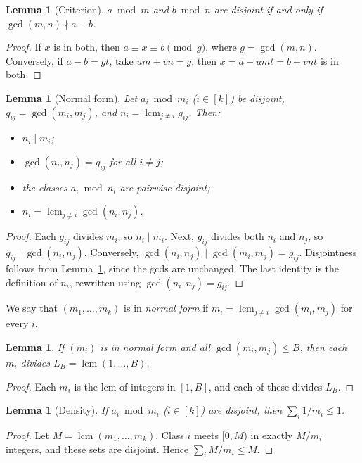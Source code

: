 \documentclass[11pt]{article}
\newtheorem{lemma}[theorem]{Lemma}
\theoremstyle{definition}
\theoremstyle{remark}
\begin{document}
\begin{lemma}[Criterion]\label{lem:crt}
$a\bmod m$ and $b\bmod n$ are disjoint if and only if $\gcd(m,n)\nmid a-b$.
\end{lemma}
\begin{proof}
If $x$ is in both, then $a\equiv x\equiv b\pmod{g}$, where $g=\gcd(m,n)$. Conversely, if $a-b=gt$,
take $um+vn=g$; then $x=a-umt=b+vnt$ is in both.
\end{proof}

\begin{lemma}[Normal form]\label{lem:nf}
Let $a_i\bmod m_i$ ($i\in[k]$) be disjoint, $g_{ij}=\gcd(m_i,m_j)$, and $n_i=\operatorname{lcm}_{j\ne i}g_{ij}$.
Then:
\begin{itemize}
\item $n_i\mid m_i$;
\item $\gcd(n_i,n_j)=g_{ij}$ for all $i\ne j$;
\item the classes $a_i\bmod n_i$ are pairwise disjoint;
\item $n_i=\operatorname{lcm}_{j\ne i}\gcd(n_i,n_j)$.
\end{itemize}
\end{lemma}
\begin{proof}
Each $g_{ij}$ divides $m_i$, so $n_i\mid m_i$. Next, $g_{ij}$ divides both $n_i$ and $n_j$, so
$g_{ij}\mid\gcd(n_i,n_j)$. Conversely, $\gcd(n_i,n_j)\mid\gcd(m_i,m_j)=g_{ij}$. Disjointness follows
from Lemma~\ref{lem:crt}, since the gcds are unchanged. The last identity is the definition of
$n_i$, rewritten using $\gcd(n_i,n_j)=g_{ij}$.
\end{proof}

We say that $(m_1,\dots,m_k)$ is in \emph{normal form} if $m_i=\operatorname{lcm}_{j\ne i}\gcd(m_i,m_j)$
for every $i$.

\begin{lemma}\label{lem:div}
If $(m_i)$ is in normal form and all $\gcd(m_i,m_j)\le B$, then each $m_i$ divides
$L_B=\operatorname{lcm}(1,\dots,B)$.
\end{lemma}
\begin{proof}
Each $m_i$ is the lcm of integers in $[1,B]$, and each of these divides $L_B$.
\end{proof}

\begin{lemma}[Density]\label{lem:dens}
If $a_i\bmod m_i$ ($i\in[k]$) are disjoint, then $\sum_i1/m_i\le1$.
\end{lemma}
\begin{proof}
Let $M=\operatorname{lcm}(m_1,\dots,m_k)$. Class $i$ meets $[0,M)$ in exactly $M/m_i$ integers, and
these sets are disjoint. Hence $\sum_iM/m_i\le M$.
\end{proof}
\end{document}
